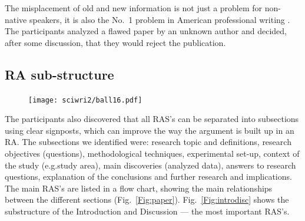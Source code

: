 \documentclass[graybox,envcountchap,sectrefs,UStrade]{svmono}
\begin{document}
The misplacement of old and new information is not just a problem for non-native speakers, it is also the No.~1 problem in American professional writing \citep{Gopen1990,germano2008getting}. The participants analyzed a flawed paper by an unknown author and decided, after some discussion, that they would reject the publication.


\subsection*{RA sub-structure}


\begin{figure}
\vspace{-20pt}
\texttt{[image: sciwri2/ball16.pdf]}
\vspace{-20pt}
\end{figure}

The participants also discovered that all RAS's can be separated into subsections using clear signposts, which can improve the way the argument is built up in an RA. The subsections we identified were: research topic and definitions, research objectives (questions), methodological techniques, experimental set-up, context of the study (e.g.\@ study area), main discoveries (analyzed data), answers to research questions, explanation of the conclusions and further research and implications. The main RAS's are listed in a flow chart, showing the main relationships between the different sections (Fig.\@~\ref{Fig:paper}). Fig.\@~\ref{Fig:introdisc} shows the substructure of the Introduction and Discussion --- the most important RAS's.\par{}
\end{document}
